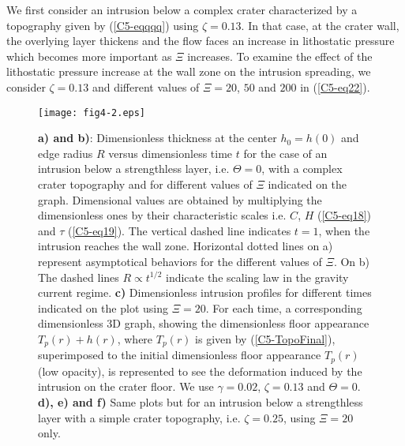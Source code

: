 We first consider an intrusion below a complex crater characterized by
a topography  given by  (\ref{C5-eqqqq}) using $\zeta=0.13$.   In that
case, at  the crater wall, the  overlying layer thickens and  the flow
faces an increase in lithostatic pressure which becomes more important
as $\Xi$ increases.  To examine the effect of the lithostatic pressure
increase  at the  wall zone  on the  intrusion spreading,  we consider
$\zeta=0.13$  and different  values  of $\Xi=20$,  $50$  and $200$  in
(\ref{C5-eq22}).

\begin{figure}[h!]
  \graphicspath{ {/Users/thorey/Documents/These/Submission/Article/FFC_JGR_2013/Papier_APRES_REVIEW/Version2/} }
  \centering
  \noindent\texttt{[image: fig4-2.eps]}
  \caption{\textbf{a) and  b)}: Dimensionless thickness at  the center
    $h_0=h(0)$ and edge  radius $R$ versus dimensionless  time $t$ for
    the  case  of  an  intrusion  below  a  strengthless  layer,  i.e.
    $\Theta=0$,  with a  complex crater  topography and  for different
    values of  $\Xi$ indicated on  the graph.  Dimensional  values are
    obtained   by  multiplying   the  dimensionless   ones  by   their
    characteristic scales  i.e.  $C$,  $H$ (\ref{C5-eq18})  and $\tau$
    (\ref{C5-eq19}). The  vertical dashed  line indicates  $t=1$, when
    the intrusion reaches the wall zone. Horizontal dotted lines on a)
    represent  asymptotical  behaviors  for the  different  values  of
    $\Xi$.  On  b) The  dashed lines  $R\propto t^{1/2}$  indicate the
    scaling   law  in   the  gravity   current  regime.    \textbf{c)}
    Dimensionless intrusion profiles for  different times indicated on
    the  plot   using  $\Xi=20$.   For  each   time,  a  corresponding
    dimensionless 3D graph, showing the dimensionless floor appearance
    $T_p(r)+h(r)$,  where $T_p(r)$  is given  by (\ref{C5-TopoFinal}),
    superimposed  to   the  initial  dimensionless   floor  appearance
    $T_p(r)$  (low opacity),  is  represented to  see the  deformation
    induced  by   the  intrusion   on  the   crater  floor.    We  use
    $\gamma=0.02$,  $\zeta=0.13$ and  $\Theta=0$.  \textbf{d),  e) and
      f)} Same plots  but for an intrusion below  a strengthless layer
    with a simple crater topography, i.e. $\zeta=0.25$, using $\Xi=20$
    only. }
  \label{C5-fig4-2}
\end{figure}

